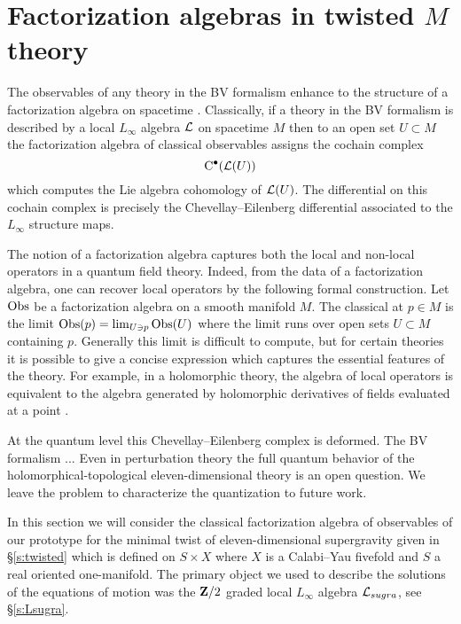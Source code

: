 \documentclass[11pt]{amsart}
\begin{document}
\section{Factorization algebras in twisted $M$ theory}

The observables of any theory in the BV formalism enhance to the structure of a factorization algebra on spacetime \cite{CG2}. 
Classically, if a theory in the BV formalism is described by a local $L_\infty$ algebra $\mathcal L$ on spacetime $M$ then to an open set $U \subset M$ the factorization algebra of classical observables assigns the cochain complex
\[
{\rm C}^\bullet(\mathcal L(U))
\]
which computes the Lie algebra cohomology of $\mathcal L(U)$. 
The differential on this cochain complex is precisely the Chevellay--Eilenberg differential associated to the $L_\infty$ structure maps. 

\begin{rmk}
The notion of a factorization algebra captures both the local and non-local operators in a quantum field theory. 
Indeed, from the data of a factorization algebra, one can recover local operators by the following formal construction. 
Let $\operatorname{Obs}$ be a factorization algebra on a smooth manifold $M$.
The classical  at $p \in M$ is the limit $\operatorname{Obs}(p) = \lim_{U \ni p} \operatorname{Obs}(U)$ where the limit runs over open sets $U \subset M$ containing $p$.
Generally this limit is difficult to compute, but for certain theories it is possible to give a concise expression which captures the essential features of the theory.
For example, in a holomorphic theory, the algebra of local operators is equivalent to the algebra generated by holomorphic derivatives of fields evaluated at a point \cite{CG2}.
\end{rmk}

At the quantum level this Chevellay--Eilenberg complex is deformed.
The BV formalism ...
Even in perturbation theory the full quantum behavior of the holomorphical-topological eleven-dimensional theory is an open question. 
We leave the problem to characterize the quantization to future work. 

In this section we will consider the classical factorization algebra of observables of our prototype for the minimal twist of eleven-dimensional supergravity given in \S \ref{s:twisted} which is defined on $S \times X$ where $X$ is a Calabi--Yau fivefold and $S$ a real oriented one-manifold. 
The primary object we used to describe the solutions of the equations of motion was the $\mathbf{Z}/2$ graded local $L_\infty$ algebra $\mathcal L_{sugra}$, see \S \ref{s:Lsugra}. 
\end{document}
